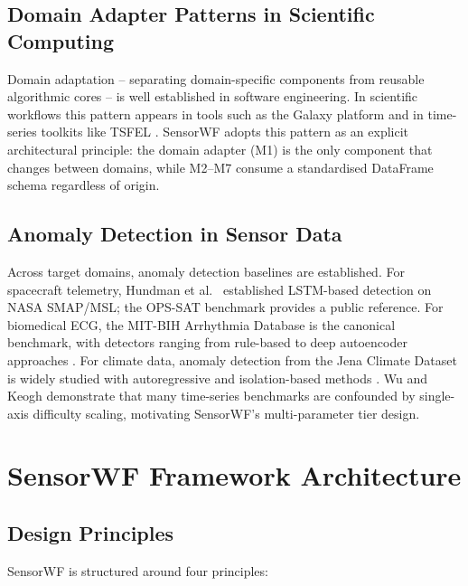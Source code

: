 \documentclass[conference]{IEEEtran}
\begin{document}
\subsection{Domain Adapter Patterns in Scientific Computing}

Domain adaptation -- separating domain-specific components from reusable
algorithmic cores -- is well established in software engineering. In scientific
workflows this pattern appears in tools such as the Galaxy platform
\cite{afgan2018galaxy} and in time-series toolkits like TSFEL \cite{barandas2020tsfel}.
SensorWF adopts this pattern as an explicit architectural principle: the domain
adapter (M1) is the only component that changes between domains, while M2--M7
consume a standardised DataFrame schema regardless of origin.

\subsection{Anomaly Detection in Sensor Data}

Across target domains, anomaly detection baselines are established. For spacecraft
telemetry, Hundman et al.\ \cite{hundman2018detecting} established LSTM-based
detection on NASA SMAP/MSL; the OPS-SAT benchmark \cite{ruszczak2025opssat}
provides a public reference. For biomedical ECG, the MIT-BIH Arrhythmia Database
\cite{moody2001mitbih} is the canonical benchmark, with detectors ranging from
rule-based to deep autoencoder approaches \cite{kachuee2018ecgclass}. For climate
data, anomaly detection from the Jena Climate Dataset \cite{jena_climate} is
widely studied with autoregressive and isolation-based methods
\cite{martinez2020climate}. Wu and Keogh \cite{wu2022benchmarks} demonstrate
that many time-series benchmarks are confounded by single-axis difficulty scaling,
motivating SensorWF's multi-parameter tier design.

\section{SensorWF Framework Architecture}
\label{sec:architecture}

\subsection{Design Principles}

SensorWF is structured around four principles:
\end{document}
